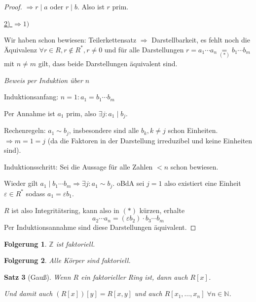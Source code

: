\documentclass[a4paper,12pt,numbers=noenddot,parskip=full]{scrartcl}
\newcommand{\setN}{\mathbb{N}}
\newcommand{\setZ}{\mathbb{Z}}
\newcommand{\heading}{\underline}
\theoremstyle{dotless}
\newtheorem{theorem}{Satz}[section]
\newtheorem{corollary}[theorem]{Folgerung}
\theoremstyle{remark}
\begin{document}
\begin{proof}
		$\Rightarrow r \mid a$ oder $r \mid b$. Also ist $r$ prim.
		
		\heading{2) $\Rightarrow 1)$}
		
		Wir haben schon bewiesen: Teilerkettensatz $\Rightarrow$ Darstellbarkeit, es fehlt noch die Äquivalenz $\forall r \in R, r \notin R^*, r \neq 0$ und für alle Darstellungen $r =  a_1 \cdots a_n \underset{(*)}{=} b_1 \cdots b_m$ mit $n \neq m$ gilt, dass beide Darstellungen äquivalent sind.
		
		\textit{Beweis per Induktion über $n$}
		
		Induktionsanfang: $n = 1: a_1 = b_1 \cdots b_m$
		
		Per Annahme ist $a_1$ prim, also $\exists j: a_1 \mid b_j$.
		
		Rechenregeln: $a_1 \sim b_j$, insbesondere sind alle $b_k, k \neq j$ schon Einheiten. $\Rightarrow m = 1 = j$ (da die Faktoren in der Darstellung irreduzibel und keine Einheiten sind).
		
		Induktionsschritt: Sei die Aussage für alle Zahlen $< n$ schon bewiesen.
		
		Wieder gilt $a_1 \mid b_1 \cdots b_m \Rightarrow \exists j: a_1 \sim b_j$. oBdA sei $j = 1$ also existiert eine Einheit $\varepsilon \in R^*$ sodass $a_1 = \varepsilon b_1$.
		
		$R$ ist also Integritätsring, kann also in $(*)$ kürzen, erhalte
		\begin{equation*}
			a_2 \cdots a_n = (\varepsilon b_2) \cdot b_3 \cdots b_m
		\end{equation*}
		Per Induktionsannahme sind diese Darstellungen äquivalent.
	\end{proof}

	\begin{corollary}
		$\setZ$ ist faktoriell.
	\end{corollary}

	\begin{corollary}
		Alle Körper sind faktoriell.
	\end{corollary}

	\begin{theorem}[Gauß]
		Wenn $R$ ein faktorieller Ring ist, dann auch $R[x]$.
		
		Und damit auch $(R[x])[y] = R[x,y]$ und auch $R[x_1, \dots, x_n] \; \forall n \in \setN$.
	\end{theorem}
\end{document}
